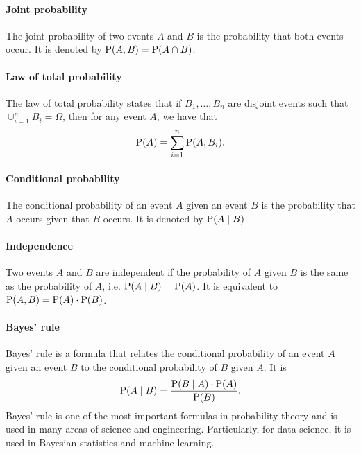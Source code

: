 \paragraph{Joint probability}

The joint probability of two events $A$ and $B$ is the probability that both events
occur.  It is denoted by $\operatorname{P}(A, B) = \operatorname{P}(A \cap B)$.

\paragraph{Law of total probability}

The law of total probability states that if $B_1, \dots, B_n$ are disjoint events
such that $\cup_{i = 1}^n B_i = \Omega$, then for any event $A$, we have that
$$\operatorname{P}(A) = \sum_{i = 1}^n \operatorname{P}(A, B_i)\text{.}$$

\paragraph{Conditional probability}

The conditional probability of an event $A$ given an event $B$ is the probability
that $A$ occurs given that $B$ occurs.  It is denoted by $\operatorname{P}(A \mid B)$.

\paragraph{Independence}

Two events $A$ and $B$ are independent if the probability of $A$ given $B$ is the
same as the probability of $A$, i.e. $\operatorname{P}(A \mid B) = \operatorname{P}(A)$.  It is equivalent to
$\operatorname{P}(A, B) = \operatorname{P}(A) \cdot \operatorname{P}(B)$.

\paragraph{Bayes' rule}

Bayes' rule is a formula that relates the conditional probability of an event $A$
given an event $B$ to the conditional probability of $B$ given $A$.  It is
\begin{equation}
  \label{eq:bayes}
  \operatorname{P}(A \mid B) = \frac{\operatorname{P}(B \mid A) \cdot \operatorname{P}(A)}{\operatorname{P}(B)}\text{.}
\end{equation}
Bayes' rule is one of the most important formulas in probability theory and is used
in many areas of science and engineering.  Particularly, for data science, it is
used in Bayesian statistics and machine learning.

